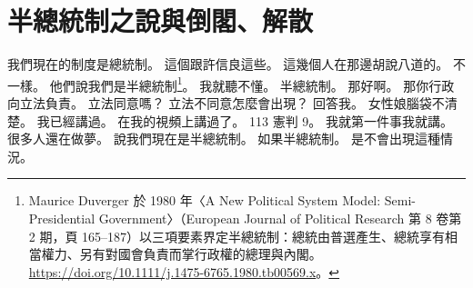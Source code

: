 \section{半總統制之說與倒閣、解散}

\hypertarget{w01:cue:2250}{}我們現在的制度是總統制。
\hypertarget{w01:cue:2251}{}這個跟許信良這些。
\hypertarget{w01:cue:2252}{}這幾個人在那邊胡說八道的。
\hypertarget{w01:cue:2253}{}不一樣。
\hypertarget{w01:cue:2254}{}他們說我們是半總統制\footnote{Maurice Duverger 於 1980 年〈A New Political System Model: Semi-Presidential Government〉（European Journal of Political Research 第 8 卷第 2 期，頁 165–187）以三項要素界定半總統制：總統由普選產生、總統享有相當權力、另有對國會負責而掌行政權的總理與內閣。\url{https://doi.org/10.1111/j.1475-6765.1980.tb00569.x}。}。
\hypertarget{w01:cue:2255}{}我就聽不懂。
\hypertarget{w01:cue:2256}{}半總統制。
\hypertarget{w01:cue:2257}{}那好啊。
\hypertarget{w01:cue:2258}{}那你行政向立法負責。
\hypertarget{w01:cue:2259}{}立法同意嗎？
\hypertarget{w01:cue:2260}{}立法不同意怎麼會出現？
\hypertarget{w01:cue:2261}{}回答我。
\hypertarget{w01:cue:2262}{}女性娘腦袋不清楚。
\hypertarget{w01:cue:2263}{}我已經講過。
\hypertarget{w01:cue:2264}{}在我的視頻上講過了。
\hypertarget{w01:cue:2265}{}113 憲判 9。
\hypertarget{w01:cue:2266}{}我就第一件事我就講。
\hypertarget{w01:cue:2267}{}很多人還在做夢。
\hypertarget{w01:cue:2268}{}說我們現在是半總統制。
\hypertarget{w01:cue:2269}{}如果半總統制。
\hypertarget{w01:cue:2270}{}是不會出現這種情況。

